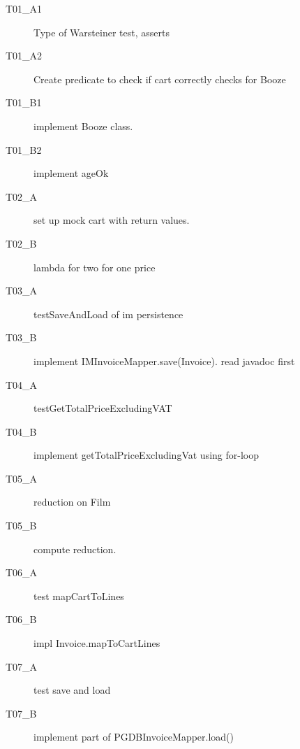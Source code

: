 \begin{description}
  \item[T01\_A1] Type of Warsteiner test, asserts
  \item[T01\_A2] Create predicate to check if cart correctly checks for Booze
  \item[T01\_B1] implement Booze class.
  \item[T01\_B2] implement ageOk
  \item[T02\_A] set up mock cart with return values.
  \item[T02\_B] lambda for two for one price
  \item[T03\_A] testSaveAndLoad of im persistence
  \item[T03\_B] implement IMInvoiceMapper.save(Invoice). read javadoc first
  \item[T04\_A] testGetTotalPriceExcludingVAT
  \item[T04\_B] implement getTotalPriceExcludingVat using for-loop
  \item[T05\_A] reduction on Film
  \item[T05\_B] compute reduction.
  \item[T06\_A] test mapCartToLines
  \item[T06\_B] impl Invoice.mapToCartLines
  \item[T07\_A] test save and load
  \item[T07\_B] implement part of PGDBInvoiceMapper.load()
\end{description}
